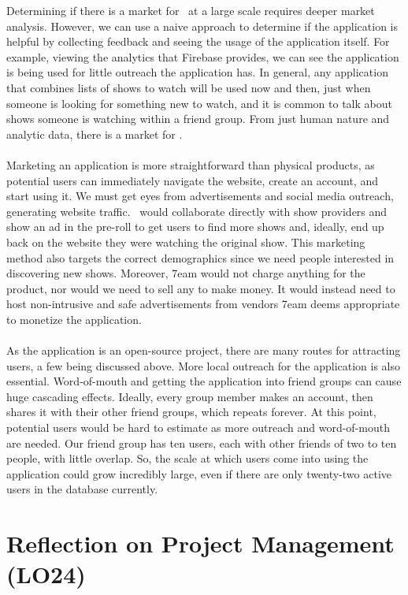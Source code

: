 \documentclass{article}
\begin{document}
\noindent Determining if there is a market for \progname ~at a large scale requires deeper market analysis. However, we can use a naive approach to determine if the application is helpful by collecting feedback and seeing the usage of the application itself. For example, viewing the analytics that Firebase provides, we can see the application is being used for little outreach the application has. In general, any application that combines lists of shows to watch will be used now and then, just when someone is looking for something new to watch, and it is common to talk about shows someone is watching within a friend group. From just human nature and analytic data, there is a market for \progname .
\\~\\ Marketing an application is more straightforward than physical products, as potential users can immediately navigate the website, create an account, and start using it. We must get eyes from advertisements and social media outreach, generating website traffic. \progname ~would collaborate directly with show providers and show an ad in the pre-roll to get users to find more shows and, ideally, end up back on the website they were watching the original show. This marketing method also targets the correct demographics since we need people interested in discovering new shows. Moreover, 7eam would not charge anything for the product, nor would we need to sell any to make money. It would instead need to host non-intrusive and safe advertisements from vendors 7eam deems appropriate to monetize the application.
\\~\\ As the application is an open-source project, there are many routes for attracting users, a few being discussed above. More local outreach for the application is also essential. Word-of-mouth and getting the application into friend groups can cause huge cascading effects. Ideally, every group member makes an account, then shares it with their other friend groups, which repeats forever. At this point, potential users would be hard to estimate as more outreach and word-of-mouth are needed. Our friend group has ten users, each with other friends of two to ten people, with little overlap. So, the scale at which users come into using the application could grow incredibly large, even if there are only twenty-two active users in the database currently.

\section{Reflection on Project Management (LO24)}
\end{document}
